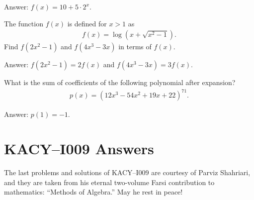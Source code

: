 \documentclass[12pt,a4paper]{memoir}
\theoremstyle{definition}
\begin{document}
	\begin{solution}%
		Answer: $f(x) = 10 + 5 \cdot 2^x$.
	\end{solution}
	
	\setcounter{question}{111}
	

	
	\begin{tcolorbox}
		\begin{question}
			The function $f(x)$ is defined for $x>1$ as
			\begin{align*}
				f(x) = \log(x+\sqrt{x^2-1}).
			\end{align*}
			Find $f(2x^2-1)$ and $f(4x^3-3x)$ in terms of $f(x)$.
		\end{question}
	\end{tcolorbox}
	
	\begin{solution}%
		Answer: $f(2x^2-1)=2f(x)$ and $f(4x^3-3x)=3f(x)$.
	\end{solution}
	

	
	
	
	\setcounter{question}{120}
	
	
	\begin{tcolorbox}
		\SetupExSheets{headings=runin}
		\begin{question}
			What is the sum of coefficients of the following polynomial after expansion?
			\begin{align*}
				p(x)=(12x^3-54x^2+19x+22)^{71}.
			\end{align*}
		\end{question}
	\end{tcolorbox}
	
	\begin{solution}%
		Answer: $p(1)=-1$.
	\end{solution}
	
	

	\newpage
	\section*{KACY--I009 Answers}
	The last problems and solutions of KACY--I009 are courtesy of Parviz Shahriari, and they are taken from his eternal two-volume Farsi contribution to mathematics: ``Methods of Algebra.'' May he rest in peace!
	
	\vspace{1em}
	
	\printsolutions
\end{document}
